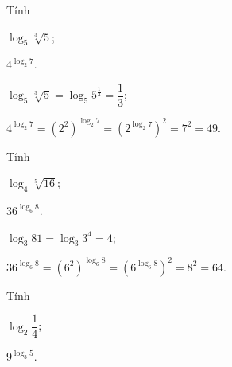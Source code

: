 \begin{bt}%
 
	Tính
	\begin{listEX}[2]
		\item  $\log _{5} \sqrt[3]{5}$;
		\item $4^{\log _{2} 7}$.
	\end{listEX}
	\loigiai
	{\begin{listEX}[1]
			\item $\log _{5} \sqrt[3]{5}=\log _{5} 5^{\frac{1}{3}}=\dfrac{1}{3}$;
			\item $4^{\log _{2} 7}=\left(2^{2}\right)^{\log _{2} 7}=\left(2^{\log _{2} 7}\right)^{2}=7^{2}=49$.
		\end{listEX}
	}
\end{bt}

\begin{bt}%
 
	Tính
	\begin{listEX}[2]
		\item  $\log _{4} \sqrt[5]{16}$;
		\item $36^{\log _{6} 8}$.
	\end{listEX}
	\loigiai
	{\begin{listEX}[1]
			\item $\log _3 81=\log _3 3^4=4$;
			\item $36^{\log _{6} 8}=\left(6^{2}\right)^{\log _{6} 8}=\left(6^{\log _{6} 8}\right)^{2}=8^{2}=64$.
		\end{listEX}
	}
\end{bt}

\begin{bt}%
	Tính
	\begin{listEX}[2]
		\item[a)] $ \log_2 \dfrac{1}{4}$;
		\item[b)] $ 9^{\log_3 5} $.
	\end{listEX}
\end{bt}


